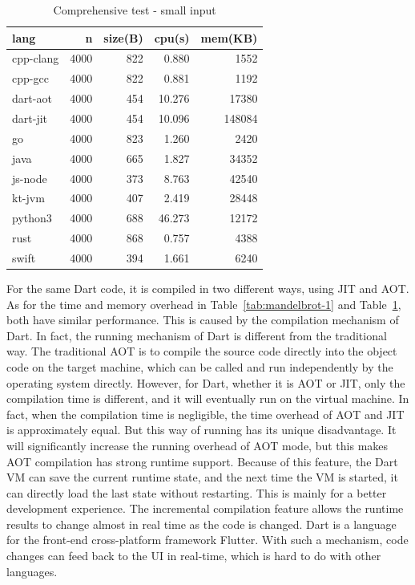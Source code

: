 \begin{table}[htbp]
    \caption{Comprehensive test - small input}
    \label{tab:mandelbrot-2}
    \begin{center}
        \begin{tabular}{lrrrr}
            \toprule
            lang      & n    & size(B) & cpu(s) & mem(KB) \\
            \midrule
            cpp-clang & 4000 & 822     & 0.880  & 1552    \\
            cpp-gcc   & 4000 & 822     & 0.881  & 1192    \\
            dart-aot  & 4000 & 454     & 10.276 & 17380   \\
            dart-jit  & 4000 & 454     & 10.096 & 148084  \\
            go        & 4000 & 823     & 1.260  & 2420    \\
            java      & 4000 & 665     & 1.827  & 34352   \\
            js-node   & 4000 & 373     & 8.763  & 42540   \\
            kt-jvm    & 4000 & 407     & 2.419  & 28448   \\
            python3   & 4000 & 688     & 46.273 & 12172   \\
            rust      & 4000 & 868     & 0.757  & 4388    \\
            swift     & 4000 & 394     & 1.661  & 6240    \\
            \bottomrule
        \end{tabular}
    \end{center}
\end{table}

For the same Dart code, it is compiled in two different ways,
using JIT and AOT. As for the time and memory overhead in Table~\ref{tab:mandelbrot-1} and Table~\ref{tab:mandelbrot-2},
both have similar performance. This is caused by the compilation mechanism of Dart. In fact, the running mechanism of Dart is different from the traditional way. The traditional AOT is to compile the source code directly into the object code on the target machine, which can be called and run independently by the operating system directly. However, for Dart, whether it is AOT or JIT, only the compilation time is different, and it will eventually run on the virtual machine. In fact, when the compilation time is negligible, the time overhead of AOT and JIT is approximately equal. But this way of running has its unique disadvantage. It will significantly increase the running overhead of AOT mode, but this makes AOT compilation has strong runtime support. Because of this feature, the Dart VM can save the current runtime state, and the next time the VM is started, it can directly load the last state without restarting. This is mainly for a better development experience. The incremental compilation feature allows the runtime results to change almost in real time as the code is changed. Dart is a language for the front-end cross-platform framework Flutter. With such a mechanism, code changes can feed back to the UI in real-time, which is hard to do with other languages.

